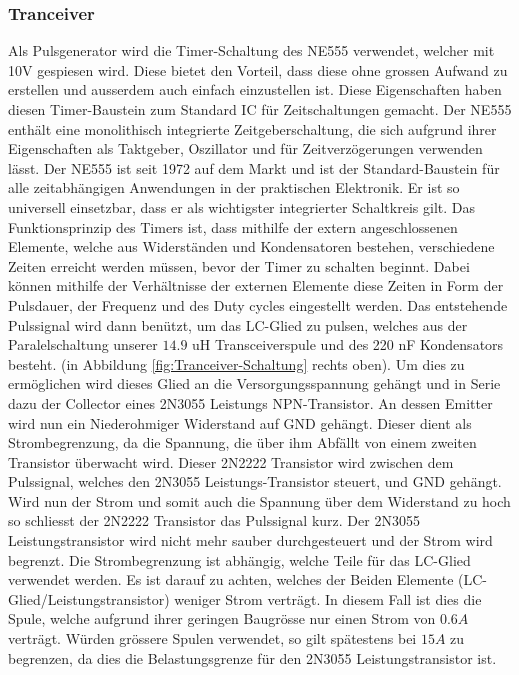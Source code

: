 \subsubsection*{Tranceiver}
Als Pulsgenerator wird die Timer-Schaltung des NE555 verwendet, welcher mit 10V gespiesen wird. Diese bietet den Vorteil, dass diese ohne grossen Aufwand zu erstellen und ausserdem auch einfach einzustellen ist. Diese Eigenschaften haben diesen Timer-Baustein zum Standard IC für Zeitschaltungen gemacht. Der NE555 enthält eine monolithisch integrierte Zeitgeberschaltung, die sich aufgrund ihrer Eigenschaften als Taktgeber, Oszillator und für Zeitverzögerungen verwenden lässt. Der NE555 ist seit 1972 auf dem Markt und ist der Standard-Baustein für alle zeitabhängigen Anwendungen in der praktischen Elektronik. Er ist so universell einsetzbar, dass er als wichtigster integrierter Schaltkreis gilt. Das Funktionsprinzip des Timers ist, dass mithilfe der extern angeschlossenen Elemente, welche aus Widerständen und Kondensatoren bestehen, verschiedene Zeiten erreicht werden müssen, bevor der Timer zu schalten beginnt. Dabei können mithilfe der Verhältnisse der externen Elemente diese Zeiten in Form der Pulsdauer, der Frequenz und des Duty cycles eingestellt werden. Das entstehende Pulssignal wird dann benützt, um das LC-Glied zu pulsen, welches aus der Paralelschaltung unserer $14.9$ uH Transceiverspule und des 220 nF Kondensators besteht. (in Abbildung \ref{fig:Tranceiver-Schaltung} rechts oben). Um dies zu ermöglichen wird dieses Glied an die Versorgungsspannung gehängt und in Serie dazu der Collector eines 2N3055 Leistungs NPN-Transistor. An dessen Emitter wird nun ein Niederohmiger Widerstand auf GND gehängt. Dieser dient als Strombegrenzung, da die Spannung, die über ihm Abfällt von einem zweiten Transistor überwacht wird. Dieser 2N2222 Transistor wird zwischen dem Pulssignal, welches den 2N3055 Leistungs-Transistor steuert, und GND gehängt. Wird nun der Strom und somit auch die Spannung über dem Widerstand zu hoch so schliesst der 2N2222 Transistor das Pulssignal kurz. Der 2N3055 Leistungstransistor wird nicht mehr sauber durchgesteuert und der Strom wird begrenzt. Die Strombegrenzung ist abhängig, welche Teile für das LC-Glied verwendet werden. Es ist darauf zu achten, welches der Beiden Elemente (LC-Glied/Leistungstransistor) weniger Strom verträgt. In diesem Fall ist dies die Spule, welche aufgrund ihrer geringen Baugrösse nur einen Strom von $0.6A$ verträgt. Würden grössere Spulen verwendet, so gilt spätestens bei $15A$ zu begrenzen, da dies die Belastungsgrenze für den 2N3055 Leistungstransistor ist.   


